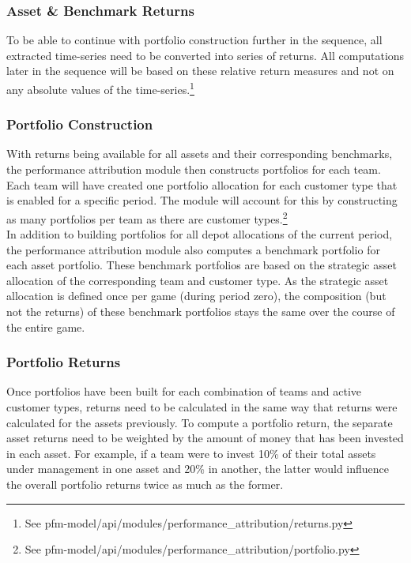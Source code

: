 \subsubsection{Asset \& Benchmark Returns}
To be able to continue with portfolio construction further in the sequence, all extracted time-series need to be converted into series of returns. All computations later in the sequence will be based on these relative return measures and not on any absolute values of the time-series.\footnote{See pfm-model/api/modules/performance\_attribution/returns.py}

\subsubsection{Portfolio Construction}
With returns being available for all assets and their corresponding benchmarks, the performance attribution module then constructs portfolios for each team. Each team will have created one portfolio allocation for each customer type that is enabled for a specific period. The module will account for this by constructing as many portfolios per team as there are customer types.\footnote{See pfm-model/api/modules/performance\_attribution/portfolio.py}\\

In addition to building portfolios for all depot allocations of the current period, the performance attribution module also computes a benchmark portfolio for each asset portfolio. These benchmark portfolios are based on the strategic asset allocation of the corresponding team and customer type. As the strategic asset allocation is defined once per game (during period zero), the composition (but not the returns) of these benchmark portfolios stays the same over the course of the entire game.

\subsubsection{Portfolio Returns}
Once portfolios have been built for each combination of teams and active customer types, returns need to be calculated in the same way that returns were calculated for the assets previously. To compute a portfolio return, the separate asset returns need to be weighted by the amount of money that has been invested in each asset. For example, if a team were to invest 10\% of their total assets under management in one asset and 20\% in another, the latter would influence the overall portfolio returns twice as much as the former.

